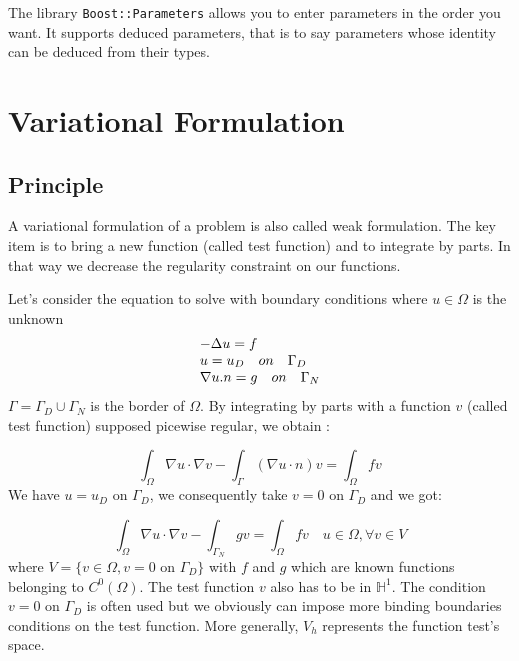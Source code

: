 \noindent The library \lstinline!Boost::Parameters! allows you to enter parameters in the order you want. It supports deduced parameters,  that is to say parameters whose identity can be deduced from their types.

\section{Variational Formulation}
\label{sec:vari-form}

\subsection{Principle}
\label{sec:vari-form-princip}
A variational formulation of a problem is also called weak formulation. The key
item is to bring a new function (called test function) and to integrate by
parts. In that way we decrease the regularity constraint on our functions.

Let's consider the equation to solve with boundary conditions where $u  \in \varOmega$ is the unknown
\begin{equation}
\begin{array}{l l l}
	-\Delta u = f  \\
	u = u_D \quad on \quad \Gamma_D \\
	\nabla u.n = g \quad on \quad \Gamma_N
\end{array}
\end{equation}
$\Gamma = \Gamma_D \cup \Gamma_N$ is the border of $\varOmega$. By integrating by parts with a function $v$ (called test function) supposed picewise regular, we obtain :

\begin{equation*}
\int_\Omega \nabla u\cdot \nabla v - \int_\Gamma (\nabla u \cdot n)v = \int_\Omega f v
\end{equation*}
We have $u=u_D $ on $\Gamma_D$, we consequently take $v=0$ on $\Gamma_D$ and we got:

\begin{equation*}
\int_\Omega \nabla u\cdot\nabla v - \int_{\Gamma_N} gv = \int_\Omega f v \quad u\in\varOmega,  \forall v \in V
\end{equation*}
where $V=\{ v\in\varOmega, v = 0$ on $ \Gamma_D\}$ with $f$ and $g$ which are known functions belonging to $C^0(\varOmega)$. The test function $v$ also has to be in $\mathbb{H}^1$. The condition $v=0$ on $\Gamma_D$ is often used but we obviously can impose more binding boundaries conditions on the test function.
More generally, $V_h$ represents the function test's space.




